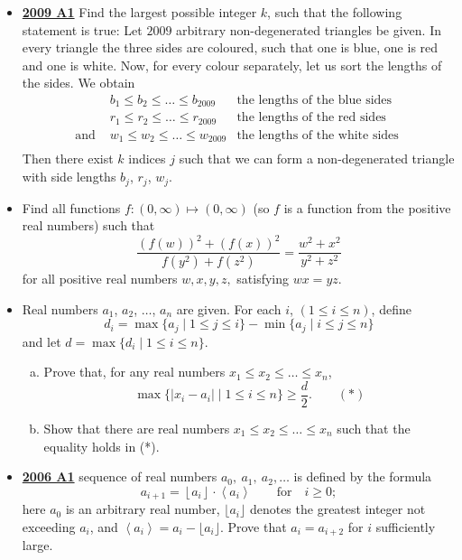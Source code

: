 \documentclass[11pt]{scrartcl}
\begin{document}
\begin{itemize}[leftmargin=*]
\item \href{https://artofproblemsolving.com/community/c6h355778p1932911}{\textbf{2009 A1}} Find the largest possible integer $k$, such that the following statement is true:
Let $2009$ arbitrary non-degenerated triangles be given. In every triangle the three sides are coloured, such that one is blue, one is red and one is white. Now, for every colour separately, let us sort the lengths of the sides. We obtain
\[ \left. \begin{array}{rcl}
 & b_1 \leqslant b_2\leqslant \dots\leqslant b_{2009} & \textrm{the lengths of the blue sides }\\
 & r_1 \leqslant r_2\leqslant \dots\leqslant r_{2009} & \textrm{the lengths of the red sides }\\
 \textrm{and } & w_1 \leqslant w_2\leqslant \dots\leqslant w_{2009} & \textrm{the lengths of the white sides }\\
 \end{array}\right.\]
Then there exist $k$ indices $j$ such that we can form a non-degenerated triangle with side lengths $b_j$, $r_j$, $w_j$.
\item {} Find all functions $ f: (0, \infty) \mapsto (0, \infty)$ (so $f$ is a function from the positive real numbers) such that
\[ \frac {\left( f(w) \right)^2 + \left( f(x) \right)^2}{f(y^2) + f(z^2) } = \frac {w^2 + x^2}{y^2 + z^2}
\]
for all positive real numbers $ w,x,y,z,$ satisfying $ wx = yz.$
\item {} Real numbers $ a_{1}$, $ a_{2}$, $ \dots$, $ a_{n}$ are given. For each $ i$, $ (1 \leqslant i \leqslant n )$, define
\[ d_{i} = \max \{ a_{j}\mid 1 \leqslant j \leqslant i \} - \min \{ a_{j}\mid i \leqslant j \leqslant n \}
\]
and let $ d = \max \{d_{i}\mid 1 \leqslant i \leqslant n \}$.
\begin{enumerate}[(a)]
    \item Prove that, for any real numbers $ x_{1}\leqslant x_{2}\leqslant \dots \leqslant x_{n}$,
\[ \max \{ |x_{i} - a_{i}| \mid 1 \leqslant i \leqslant n \}\geqslant  \frac {d}{2}. \quad \quad (*)
\]
    \item Show that there are real numbers $ x_{1}\leqslant x_{2}\leqslant \dots \leqslant x_{n}$ such that the equality holds in (*).
\end{enumerate}


\item \href{https://artofproblemsolving.com/community/c6h130814p741371}{\textbf{2006 A1}} sequence of real numbers $ a_{0},\ a_{1},\ a_{2},\dots$ is defined by the formula
\[ a_{i + 1} = \left\lfloor a_{i}\right\rfloor\cdot \left\langle a_{i}\right\rangle\qquad\text{for}\quad i\geqslant  0;
\]here $a_0$ is an arbitrary real number, $\lfloor a_i\rfloor$ denotes the greatest integer not exceeding $a_i$, and $\left\langle a_i\right\rangle=a_i-\lfloor a_i\rfloor$. Prove that $a_i=a_{i+2}$ for $i$ sufficiently large.
\end{itemize}
\newpage
\end{document}

